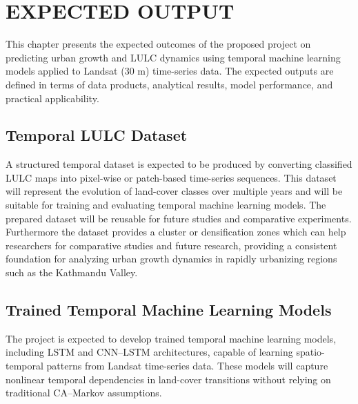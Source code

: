 \documentclass[main]{subfiles}
\begin{document}
\chapter{\MakeUppercase{EXPECTED OUTPUT}}

This chapter presents the expected outcomes of the proposed project on predicting urban growth and LULC dynamics using temporal machine learning models applied to Landsat (30 m) time-series data. The expected outputs are defined in terms of data products, analytical results, model performance, and practical applicability.



\section{Temporal LULC Dataset}

A structured temporal dataset is expected to be produced by converting classified LULC maps into pixel-wise or patch-based time-series sequences. This dataset will represent the evolution of land-cover classes over multiple years and will be suitable for training and evaluating temporal machine learning models. The prepared dataset will be reusable for future studies and comparative experiments. Furthermore the dataset provides a cluster or densification zones which can help researchers for comparative studies and future research, providing a consistent foundation for analyzing urban growth dynamics in rapidly urbanizing regions such as the Kathmandu Valley.

\section{Trained Temporal Machine Learning Models}

The project is expected to develop trained temporal machine learning models, including LSTM and CNN--LSTM architectures, capable of learning spatio-temporal patterns from Landsat time-series data. These models will capture nonlinear temporal dependencies in land-cover transitions without relying on traditional CA--Markov assumptions.
\end{document}

